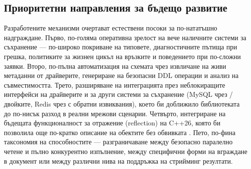 \subsection{Приоритетни направления за бъдещо развитие}
\label{subsec:future_directions}

Разработените механизми очертават естествени посоки за по-нататъшно надграждане. Първо, по-голяма оперативна зрелост на вече наличните системи за съхранение --- по-широко покриване на типовете, диагностичните пътища при грешка, политиките за жизнен цикъл на връзките и поведението при по-сложни заявки. Второ, по-пълна автоматизация на схемата чрез извличане на живи метаданни от драйверите, генериране на безопасни DDL операции и анализ на съвместимостта. Трето, разширяване на интеграцията през неблокиращите интерфейси на драйверите и за други системи за съхранение (MySQL чрез / двойките, Redis чрез  с обратни извиквания), което би доближило библиотеката до по-нисък разход в реални мрежови сценарии. Четвърто, интегриране на бъдещата функционалност за отражение (reflection) на C++26, която би позволила още по-кратко описание на обектите без обвивката . Пето, по-фина таксономия на способностите --- разграничаване между безопасно паралелно четене и пълно конкурентно изпълнение, между специфични форми на вграждане в документ или между различни нива на поддръжка на стрийминг резултати.

